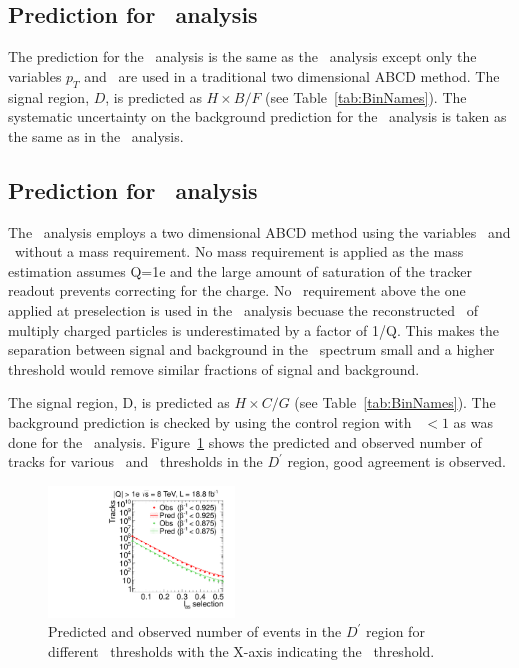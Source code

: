 \subsection{Prediction for \tkonly\ analysis}

The prediction for the \tkonly\ analysis is the same as the \tktof\ analysis except only the variables $p_T$ and \ias\ are used in a traditional two
dimensional ABCD method. 
The signal region, $D$, is predicted as $H \times B / F$ (see Table~\ref{tab:BinNames}).
The systematic uncertainty on the background prediction for the \tkonly\ analysis is taken as the same as in the \tktof\ analysis.

\subsection{Prediction for \multi\ analysis}

The \multi\ analysis employs a two dimensional ABCD method using the variables \invbeta\ and \ias\ without a mass requirement. No mass requirement is applied as the mass
estimation assumes Q=1e and the large amount of saturation of the tracker readout prevents correcting for the charge.
No \pt\ requirement above the one applied at preselection is used in the \multi\ analysis becuase the reconstructed \pt\ of
multiply charged particles is underestimated by a factor of 1/Q. This makes the separation between signal and background in the \pt\ spectrum small and a
higher threshold would remove similar fractions of signal and background.

The signal region, D, is predicted as $H \times C / G$ (see Table~\ref{tab:BinNames}).
The background prediction is checked by using 
the control region with \invbeta\ $< 1$ as was done for the \muononly\ analysis.
Figure~\ref{fig:MultiPred} shows the predicted and observed number of tracks for various \invbeta\ and \ias\ thresholds in the $D^{\prime}$ region, good agreement is observed.

\begin{figure}
 \begin{center}
  \includegraphics[clip=true, trim=0.0cm 0cm 2.8cm 0cm,width=0.44\textwidth]{figures/multi/Prediction_Data8TeV_NPredVsNObs_Flip}
 \end{center}
 \caption[Predicted and observed number of events in the \invbeta\ $<$ 1 region for different sets of thresholds in the \multi\ analysis.]
{Predicted and observed number of events in the $D^{\prime}$ region for different \invbeta\ thresholds with the X-axis indicating the \ias\ threshold.}
\label{fig:MultiPred}
\end{figure}

